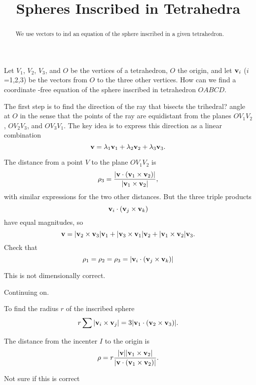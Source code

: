 \documentclass{ximera}
\title{Spheres Inscribed in Tetrahedra}
\begin{document}
\begin{abstract}
We use vectors to ind an equation of the sphere inscribed in a given tetrahedron.
\end{abstract}
\maketitle

Let $V_1$, $V_2$, $V_3$, and $O$ be the vertices of a tetrahedron, $O$ the origin, and let ${\bf v}_i$ ($i$=1,2,3) be the vectors from $O$ to the three other vertices. How can we find a coordinate -free equation of the sphere inscribed in tetrahedron $OABCD$.

The first step is to find the direction of the ray that bisects the trihedral? angle at $O$ in the sense that the points of the ray are equidistant from the planes $OV_1V_2$, $OV_2V_3$, and $OV_3V_1$. The key idea is to express this direction as a linear combination
\[
   {\bf v} = \lambda_1 {\bf v}_1 + \lambda_2 {\bf v}_2 + \lambda_3 {\bf v}_3  .
\]

The distance from a point $V$ to the plane $OV_1V_2$ is
\[
       \rho_3 = \frac{|{\bf v}\cdot ({\bf v}_1\times {\bf v}_2)|}{| {\bf v}_1\times {\bf v}_2 |} ,
\]
with similar expressions for the two other distances. But the three triple products 
\[
 {\bf v}_i\cdot ({\bf v}_j\times {\bf v}_k)
\]
have equal magnitudes, so
\[
  {\bf v} = | {\bf v}_2\times {\bf v}_3 | {\bf v}_1 + |{\bf v}_3\times {\bf v}_1 | {\bf v}_2 + | {\bf v}_1\times {\bf v}_2| {\bf v}_3  .
\]
Check that 
\[
    \rho_1 = \rho_2 = \rho_3 = |  {\bf v}_i\cdot ({\bf v}_j\times {\bf v}_k)   | 
\]

This is not dimensionally correct.

Continuing on.

To find the radius $r$ of the inscribed sphere
\[
   r \sum | {\bf v}_i \times {\bf v}_j   | = 3 |{\bf v}_1\cdot ({\bf v}_2\times {\bf v}_3)|.
\]


The distance from the incenter $I$ to the origin is
\[
    \rho = r  \frac{|{\bf v}||{\bf v}_1\times {\bf v}_2 |}{| {\bf v}\cdot ({\bf v}_1\times {\bf v}_2)  |} .
\]


Not sure if this is correct
\end{document}
